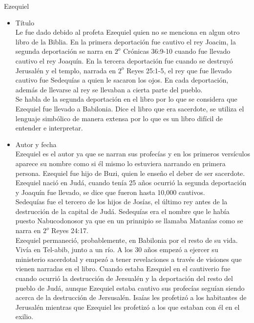 %

%
\begin{section}{Ezequiel}
\begin{itemize}
	\item Título\\
		Le fue dado debido al profeta Ezequiel quien no se menciona en algun otro libro de la Biblia. En la primera deportación fue cautivo el rey Joacim, la segunda deportación se narra en $2^{o}$ Crónicas 36:9-10 cuando fue llevado cautivo el rey Joaquín. En la tercera deportación fue cuando se destruyó Jerusalén y el templo, narrada en $2^{o}$ Reyes 25:1-5, el rey que fue llevado cautivo fue Sedequías a quien le sacaron los ojos. En cada deportación, además de llevarse al rey se llevaban a cierta parte del pueblo.\\
		Se habla de la segunda deportación en el libro por lo que se considera que Ezequiel fue llevado a Babilonia. Dice el libro que era sacerdote, se utiliza el lenguaje simbólico de manera extensa por lo que es un libro difícil de entender e interpretar.
	\item Autor y fecha\\
		Ezequiel es el autor ya que se narran sus profecías y en los primeros versículos aparece su nombre como si él mismo lo estuviera narrando en primera persona. Ezequiel fue hijo de Buzi, quien le enseño el deber de ser sacerdote. Ezequiel nació en Judá, cuando tenía 25 años ocurrió la segunda deportación y Joaquín fue llevado, se dice que fueron hasta 10,000 cautivos.\\
		Sedequías fue el tercero de los hijos de Josías, el último rey antes de la destrucción de la capital de Judá. Sedequías era el nombre que le había puesto Nabucodonosor ya que en un prinnipio se llamaba Matanías como se narra en $2^{o}$ Reyes 24:17.\\
		Ezequiel permaneció, probablemente, en Babilonia por el resto de su vida. Vivía en Tel-abib, junto a un río. A los 30 años empezó a ejercer su ministerio sacerdotal y empezó a tener revelaciones a través de visiones que vienen narradas en el libro. Cuando estaba Ezequiel en el cautiverio fue cuando ocurrió la destrucción de Jersualén y la deportación del resto del pueblo de Judá, aunque Ezequiel estaba cautivo sus profecías seguían siendo acerca de la destrucción de Jersusalén. Isaías les profetizó a los habitantes de Jerusalén mientras que Ezequiel les profetizó a los que estaban con él en el exilio.\\

\end{itemize}
\end{section}
